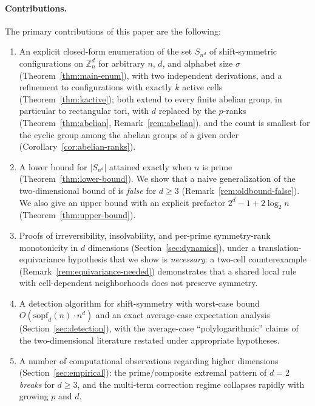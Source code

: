 \documentclass[11pt,a4paper]{article}
\theoremstyle{remark}
\newcommand{\ZZ}{\mathbb{Z}}
\begin{document}
\paragraph{Contributions.} The primary contributions of this paper are the following:
\begin{enumerate}[label=(\roman*)]
    \item An explicit closed-form enumeration of the set $S_{n^d}$ of shift-symmetric
    configurations on $\ZZ_n^d$ for arbitrary $n$, $d$, and alphabet size
    $\sigma$ (Theorem~\ref{thm:main-enum}), with two independent
    derivations, and a refinement to configurations with exactly $k$
    active cells (Theorem~\ref{thm:kactive}); both extend to every finite
    abelian group, in particular to rectangular tori, with $d$ replaced by
    the $p$-ranks (Theorem~\ref{thm:abelian}, Remark~\ref{rem:abelian}), and
    the count is smallest for
    the cyclic group among the abelian groups of a given order
    (Corollary~\ref{cor:abelian-ranks}).
    \item A lower bound for $|S_{n^d}|$  attained exactly when $n$ is prime
    (Theorem~\ref{thm:lower-bound}). We show that a naive generalization of the
    two-dimensional bound of \cite{banda2019} is \emph{false} for $d\ge3$
    (Remark~\ref{rem:oldbound-false}). We also give an upper bound with an
    explicit prefactor $2^d-1+2\log_2 n$ (Theorem~\ref{thm:upper-bound}).
    \item Proofs of irreversibility, insolvability, and per-prime symmetry-rank
    monotonicity in $d$ dimensions (Section~\ref{sec:dynamics}), under a
    translation-equivariance hypothesis that we show is \emph{necessary}: a
    two-cell counterexample (Remark~\ref{rem:equivariance-needed})
    demonstrates that a shared local rule with cell-dependent neighborhoods
    does not preserve symmetry.
    \item A detection algorithm for shift-symmetry with worst-case bound
    $O(\mathrm{sopf}_d(n)\cdot n^d)$ and an exact average-case expectation
    analysis (Section~\ref{sec:detection}), with the average-case
    ``polylogarithmic'' claims of the two-dimensional literature restated
    under appropriate hypotheses.
    \item A number of computational observations regarding higher
    dimensions (Section~\ref{sec:empirical}): the prime/composite extremal
    pattern of $d=2$ \emph{breaks} for $d\ge3$, and the multi-term
    correction regime collapses rapidly with growing $p$ and $d$.
\end{enumerate}
\end{document}
